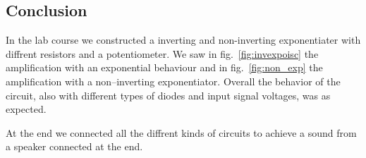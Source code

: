 \documentclass[a4paper,10pt]{article}
\numberwithin{equation}{section}
\begin{document}
\begin{multicols}{2}
  \section{Conclusion}
  In the lab course we constructed a inverting and non-inverting exponentiater with diffrent resistors and a potentiometer. We saw in fig.\ \ref{fig:invexpoisc} the amplification with an exponential behaviour and in fig.\ \ref{fig:non_exp} the amplification with a non--inverting exponentiator.
  Overall the behavior of the circuit, also with different types of diodes and input signal voltages, was as expected. 

  At the end we connected all the diffrent kinds of circuits to achieve a sound from a speaker connected at the end. 
\end{multicols}

\clearpage
\listoffigures
\listoftables



\end{document}
